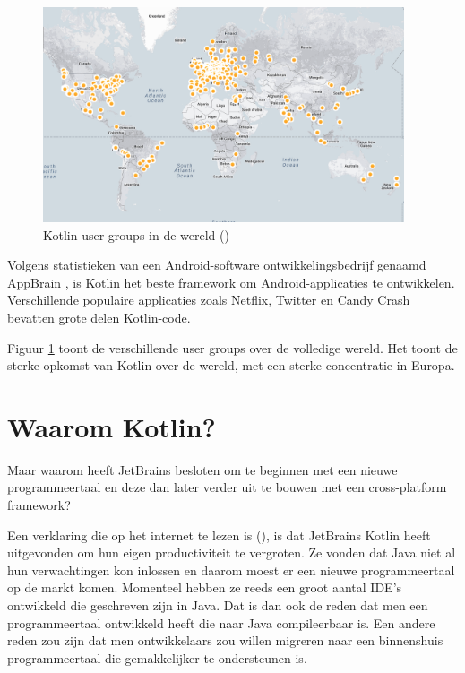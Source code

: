\begin{figure} [ht]
	\centering
	\includegraphics[width=0.95\textwidth]{img/KUGmap.png}
	\caption{Kotlin user groups in de wereld (\cite{JetBrains12})}
	\label{fig:usergroups}
\end{figure}

Volgens statistieken van een Android-software ontwikkelingsbedrijf genaamd AppBrain \autocite{AppBrain}, is Kotlin het beste framework om Android-applicaties te ontwikkelen. Verschillende populaire applicaties zoals Netflix, Twitter en Candy Crash bevatten grote delen Kotlin-code.

Figuur \ref{fig:usergroups} toont de verschillende user groups over de volledige wereld. Het toont de sterke opkomst van Kotlin over de wereld, met een sterke concentratie in Europa.

\section{Waarom Kotlin?}
\label{sec:whykotlin}
Maar waarom heeft JetBrains besloten om te beginnen met een nieuwe programmeertaal en deze dan later verder uit te bouwen met een cross-platform framework?

Een verklaring die op het internet te lezen is (\cite{TechYourChance}), is dat JetBrains Kotlin heeft uitgevonden om hun eigen productiviteit te vergroten. Ze vonden dat Java niet al hun verwachtingen kon inlossen en daarom moest er een nieuwe programmeertaal op de markt komen. Momenteel hebben ze reeds een groot aantal IDE's ontwikkeld die geschreven zijn in Java. Dat is dan ook de reden dat men een programmeertaal ontwikkeld heeft die naar Java compileerbaar is. Een andere reden zou zijn dat men ontwikkelaars zou willen migreren naar een binnenshuis programmeertaal die gemakkelijker te ondersteunen is.

